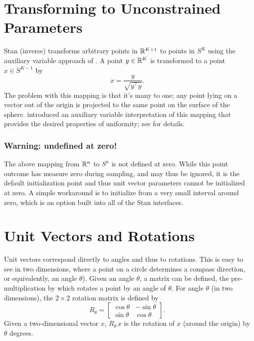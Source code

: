 \section{Transforming to Unconstrained Parameters}

Stan (inverse) transforms arbitrary points in $\reals^{K+1}$ to points
in $S^K$ using the auxiliary variable approach of
\cite{Marsaglia:1972}.  A point $y \in \reals^K$ is transformed to a
point $x \in S^{K-1}$ by
%
\[
x = \frac{y}{\sqrt{y^{\top} y}}.
\]
%
The problem with this mapping is that it's many to one; any point
lying on a vector out of the origin is projected to the same point on
the surface of the sphere.  \cite{Marsaglia:1972} introduced an
auxiliary variable interpretation of this mapping that provides the
desired properties of uniformity; see  for
details. 


\subsubsection{Warning: undefined at zero!}

The above mapping from $\reals^n$ to $S^n$ is not defined at zero.
While this point outcome has measure zero during sampling, and may
thus be ignored, it is the default initialization point and thus unit
vector parameters cannot be initialized at zero.  A simple workaround
is to initialize from a very small interval around zero, which is an
option built into all of the Stan interfaces.



\section{Unit Vectors and Rotations}

Unit vectors correspond directly to angles and thus to rotations.
This is easy to see in two dimensions, where a point on a circle
determines a compass direction, or equivalently, an angle $\theta$).
Given an angle $\theta$, a matrix can be defined, the
pre-multiplication by which rotates a point by an angle of $\theta$.
For angle $\theta$ (in two dimensions), the $2 \times 2$ rotation
matrix is defined by
\[
R_{\theta}
=
\begin{bmatrix}
\cos \theta & - \sin \theta 
\\
\sin \theta & \cos \theta
\end{bmatrix}.
\]
Given a two-dimensional vector $x$, $R_{\theta} \, x$ is the rotation
of $x$ (around the origin) by $\theta$ degrees.


